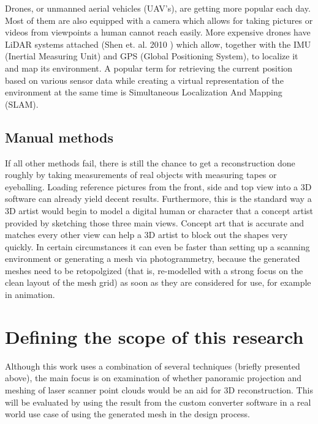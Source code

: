 Drones, or unmanned aerial vehicles (UAV's), are getting more popular each day. Most of them are also equipped with a camera which allows for taking pictures or videos from viewpoints a human cannot reach easily. More expensive drones have LiDAR systems attached (Shen et. al. 2010 \parencite{drones_lidar}) which allow, together with the IMU (Inertial Measuring Unit) and GPS (Global Positioning System), to localize it and map its environment. A popular term for retrieving the current position based on various sensor data while creating a virtual representation of the environment at the same time is Simultaneous Localization And Mapping (SLAM).

\subsection{Manual methods}

If all other methods fail, there is still the chance to get a reconstruction done roughly by taking measurements of real objects with measuring tapes or eyeballing. Loading reference pictures from the front, side and top view into a 3D software can already yield decent results. Furthermore, this is the standard way a 3D artist would begin to model a digital human or character that a concept artist provided by sketching those three main views. Concept art that is accurate and matches every other view can help a 3D artist to block out the shapes very quickly. In certain circumstances it can even be faster than setting up a scanning environment or generating a mesh via photogrammetry, because the generated meshes need to be retopolgized (that is, re-modelled with a strong focus on the clean layout of the mesh grid) as soon as they are considered for use, for example in animation.

\section{Defining the scope of this research}

Although this work uses a combination of several techniques (briefly presented above), the main focus is on examination of whether panoramic projection and meshing of laser scanner point clouds would be an aid for 3D reconstruction. This will be evaluated by using the result from the custom converter software in a real world use case of using the generated mesh in the design process.